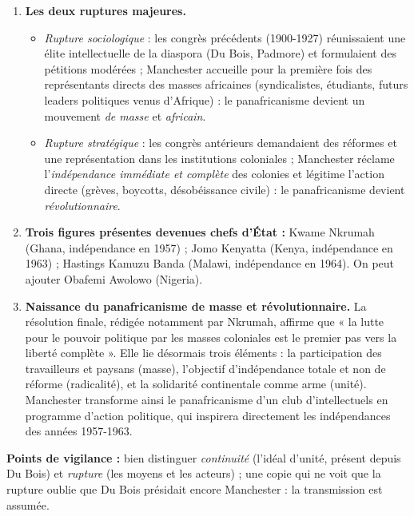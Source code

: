 \documentclass[11pt]{article}
\begin{document}
\begin{corrige}
\begin{enumerate}
\item \textbf{Les deux ruptures majeures.}
\begin{itemize}
\item \emph{Rupture sociologique} : les congrès précédents (1900-1927) réunissaient une élite intellectuelle de la diaspora (Du Bois, Padmore) et formulaient des pétitions modérées ; Manchester accueille pour la première fois des représentants directs des masses africaines (syndicalistes, étudiants, futurs leaders politiques venus d'Afrique) : le panafricanisme devient un mouvement \emph{de masse} et \emph{africain}.
\item \emph{Rupture stratégique} : les congrès antérieurs demandaient des réformes et une représentation dans les institutions coloniales ; Manchester réclame l'\emph{indépendance immédiate et complète} des colonies et légitime l'action directe (grèves, boycotts, désobéissance civile) : le panafricanisme devient \emph{révolutionnaire}.
\end{itemize}
\item \textbf{Trois figures présentes devenues chefs d'État :} Kwame Nkrumah (Ghana, indépendance en 1957) ; Jomo Kenyatta (Kenya, indépendance en 1963) ; Hastings Kamuzu Banda (Malawi, indépendance en 1964). On peut ajouter Obafemi Awolowo (Nigeria).
\item \textbf{Naissance du panafricanisme de masse et révolutionnaire.} La résolution finale, rédigée notamment par Nkrumah, affirme que « la lutte pour le pouvoir politique par les masses coloniales est le premier pas vers la liberté complète ». Elle lie désormais trois éléments : la participation des travailleurs et paysans (masse), l'objectif d'indépendance totale et non de réforme (radicalité), et la solidarité continentale comme arme (unité). Manchester transforme ainsi le panafricanisme d'un club d'intellectuels en programme d'action politique, qui inspirera directement les indépendances des années 1957-1963.
\end{enumerate}

\textbf{Points de vigilance :} bien distinguer \emph{continuité} (l'idéal d'unité, présent depuis Du Bois) et \emph{rupture} (les moyens et les acteurs) ; une copie qui ne voit que la rupture oublie que Du Bois présidait encore Manchester : la transmission est assumée.
\end{corrige}
\end{document}
